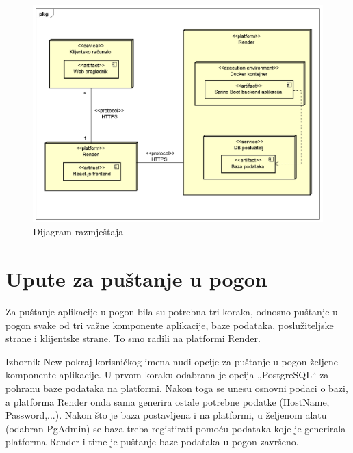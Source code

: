 			\begin{figure}[H]
				\includegraphics[width=\textwidth]{dijagrami/DeploymentDiagram.PNG} 
				\caption{Dijagram razmještaja}
				\label{fig:DeploymentDiagram}
			\end{figure}
			
			\eject 
		
		\section{Upute za puštanje u pogon}
		
			Za puštanje aplikacije u pogon bila su potrebna tri koraka, odnosno puštanje u pogon svake od tri važne komponente aplikacije, baze podataka, poslužiteljske strane i klijentske strane. To smo radili na platformi Render. 
			
			Izbornik New pokraj korisničkog imena nudi opcije za puštanje u pogon željene komponente aplikacije. U prvom koraku odabrana je opcija „PostgreSQL“ za pohranu baze podataka na platformi. Nakon toga se unesu osnovni podaci o bazi, a platforma Render onda sama generira ostale potrebne podatke (HostName, Password,...). Nakon što je baza postavljena i na platformi, u željenom alatu (odabran PgAdmin) se baza treba registirati pomoću podataka koje je generirala platforma Render i time je puštanje baze podataka u pogon završeno.
			
